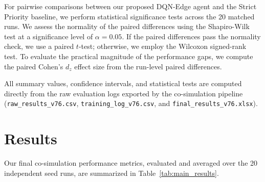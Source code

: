 \documentclass[runningheads,a4paper]{llncs}
\begin{document}
For pairwise comparisons between our proposed DQN-Edge agent and the Strict Priority baseline, we perform statistical significance tests across the 20 matched runs. We assess the normality of the paired differences using the Shapiro-Wilk test at a significance level of $\alpha = 0.05$. If the paired differences pass the normality check, we use a paired $t$-test; otherwise, we employ the Wilcoxon signed-rank test. To evaluate the practical magnitude of the performance gaps, we compute the paired Cohen's $d_z$ effect size from the run-level paired differences.

All summary values, confidence intervals, and statistical tests are computed directly from the raw evaluation logs exported by the co-simulation pipeline (\texttt{raw\_results\_v76.csv}, \texttt{training\_log\_v76.csv}, and \texttt{final\_results\_v76.xlsx}).

\section{Results}

Our final co-simulation performance metrics, evaluated and averaged over the 20 independent seed runs, are summarized in Table~\ref{tab:main_results}.

\begin{table}[t]
\centering
\caption{Overall WSN Performance Metrics Across 20 Matched Evaluation Runs (Mean $\pm$ 95\% CI).}
\label{tab:main_results}
\end{table}
\end{document}
